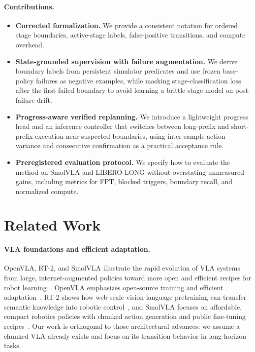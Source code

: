 \documentclass[10pt]{article}
\begin{document}
\paragraph{Contributions.}
\begin{itemize}[leftmargin=1.5em, itemsep=0.15em]
  \item \textbf{Corrected formalization.}
  We provide a consistent notation for ordered stage boundaries, active-stage
  labels, false-positive transitions, and compute overhead.
  \item \textbf{State-grounded supervision with failure augmentation.}
  We derive boundary labels from persistent simulator predicates and use frozen
  base-policy failures as negative examples, while masking stage-classification
  loss after the first failed boundary to avoid learning a brittle stage model on
  post-failure drift.
  \item \textbf{Progress-aware verified replanning.}
  We introduce a lightweight progress head and an inference controller that
  switches between long-prefix and short-prefix execution near suspected
  boundaries, using inter-sample action variance and consecutive confirmation as
  a practical acceptance rule.
  \item \textbf{Preregistered evaluation protocol.}
  We specify how to evaluate the method on SmolVLA and LIBERO-LONG without
  overstating unmeasured gains, including metrics for FPT, blocked triggers,
  boundary recall, and normalized compute.
\end{itemize}

\section{Related Work}

\paragraph{VLA foundations and efficient adaptation.}
OpenVLA, RT-2, and SmolVLA illustrate the rapid evolution of VLA systems from
large, internet-augmented policies toward more open and efficient recipes for
robot learning~\cite{openvla,rt2,msplora}.
OpenVLA emphasizes open-source training and efficient adaptation~\cite{openvla},
RT-2 shows how web-scale vision-language pretraining can transfer semantic
knowledge into robotic control~\cite{rt2}, and SmolVLA focuses on affordable,
compact robotics policies with chunked action generation and public fine-tuning
recipes~\cite{msplora}.
Our work is orthogonal to those architectural advances: we assume a chunked VLA
already exists and focus on its transition behavior in long-horizon tasks.
\end{document}
